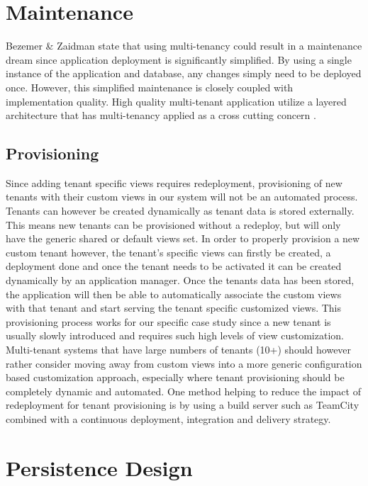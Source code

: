 \section{Maintenance}

Bezemer \& Zaidman \cite{Bezemer:2010:MSA:1862372.1862393} state that using multi-tenancy could result in a maintenance dream since application deployment is significantly simplified. By using a single instance of the application and database, any changes simply need to be deployed once. However, this simplified maintenance is closely coupled with implementation quality. High quality multi-tenant application utilize a layered architecture that has multi-tenancy applied as a cross cutting concern \cite{Bezemer:2010:MSA:1862372.1862393}.


\subsection{Provisioning}

Since adding tenant specific views requires redeployment, provisioning of new tenants with their custom views in our system will not be an automated process. Tenants can however be created dynamically as tenant data is stored externally. This means new tenants can be provisioned without a redeploy, but will only have the generic shared or default views set. In order to properly provision a new custom tenant however, the tenant's specific views can firstly be created, a deployment done and once the tenant needs to be activated it can be created dynamically by an application manager. Once the tenants data has been stored, the application will then be able to automatically associate the custom views with that tenant and start serving the tenant specific customized views. This provisioning process works for our specific case study since a new tenant is usually slowly introduced and requires such high levels of view customization. Multi-tenant systems that have large numbers of tenants (10+) should however rather consider moving away from custom views into a more generic configuration based customization approach, especially where tenant provisioning should be completely dynamic and automated. One method helping to reduce the impact of redeployment for tenant provisioning is by using a build server such as TeamCity combined with a continuous deployment, integration and delivery strategy.


\section{Persistence Design}

